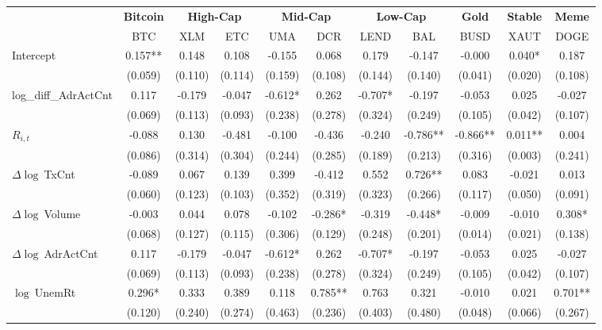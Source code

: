 \begin{table}[ht]
\centering
\scriptsize
\setlength{\tabcolsep}{4pt}
\begin{tabular}{l *{10}{c}}
\toprule
&\multicolumn{1}{c}{\textbf{Bitcoin}}&\multicolumn{2}{c}{\textbf{High-Cap}}&\multicolumn{2}{c}{\textbf{Mid-Cap}}&\multicolumn{2}{c}{\textbf{Low-Cap}}&\multicolumn{1}{c}{\textbf{Gold}}&\multicolumn{1}{c}{\textbf{Stable}}&\multicolumn{1}{c}{\textbf{Meme}}\\
\addlinespace
 & BTC & XLM & ETC & UMA & DCR & LEND & BAL & BUSD & XAUT & DOGE \\
\midrule
Intercept & 0.157** & 0.148 & 0.108 & -0.155 & 0.068 & 0.179 & -0.147 & -0.000 & 0.040* & 0.187 \\
 & (0.059) & (0.110) & (0.114) & (0.159) & (0.108) & (0.144) & (0.140) & (0.041) & (0.020) & (0.108) \\
\addlinespace
log_diff_AdrActCnt & 0.117 & -0.179 & -0.047 & -0.612* & 0.262 & -0.707* & -0.197 & -0.053 & 0.025 & -0.027 \\
 & (0.069) & (0.113) & (0.093) & (0.238) & (0.278) & (0.324) & (0.249) & (0.105) & (0.042) & (0.107) \\
\addlinespace
$R_{i,t}$ & -0.088 & 0.130 & -0.481 & -0.100 & -0.436 & -0.240 & -0.786** & -0.866** & 0.011** & 0.004 \\
 & (0.086) & (0.314) & (0.304) & (0.244) & (0.285) & (0.189) & (0.213) & (0.316) & (0.003) & (0.241) \\
\addlinespace
$\Delta\log\ $TxCnt & -0.089 & 0.067 & 0.139 & 0.399 & -0.412 & 0.552 & 0.726** & 0.083 & -0.021 & 0.013 \\
 & (0.060) & (0.123) & (0.103) & (0.352) & (0.319) & (0.323) & (0.266) & (0.117) & (0.050) & (0.091) \\
\addlinespace
$\Delta\log\ $Volume & -0.003 & 0.044 & 0.078 & -0.102 & -0.286* & -0.319 & -0.448* & -0.009 & -0.010 & 0.308* \\
 & (0.068) & (0.127) & (0.115) & (0.306) & (0.129) & (0.248) & (0.201) & (0.014) & (0.021) & (0.138) \\
\addlinespace
$\Delta\log\ $AdrActCnt & 0.117 & -0.179 & -0.047 & -0.612* & 0.262 & -0.707* & -0.197 & -0.053 & 0.025 & -0.027 \\
 & (0.069) & (0.113) & (0.093) & (0.238) & (0.278) & (0.324) & (0.249) & (0.105) & (0.042) & (0.107) \\
\addlinespace
$\log\ $UnemRt & 0.296* & 0.333 & 0.389 & 0.118 & 0.785** & 0.763 & 0.321 & -0.010 & 0.021 & 0.701** \\
 & (0.120) & (0.240) & (0.274) & (0.463) & (0.236) & (0.403) & (0.480) & (0.048) & (0.066) & (0.267) \\

\end{tabular}
\end{table}
